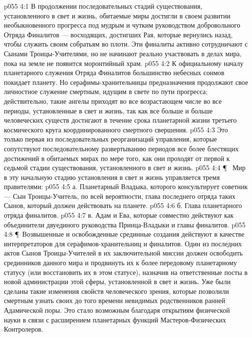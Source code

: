 \vs p055 4:1 В продолжении последовательных стадий существования, установленного в свет и жизнь, обитаемые миры достигли в своем развитии необыкновенного прогресса под мудрым и чутким руководством добровольного Отряда Финалитов --- восходящих, достигших Рая, которые вернулись назад, чтобы служить своим собратьям во плоти. Эти финалиты активно сотрудничают с Сынами Троицы\hyp{}Учителями, но не начинают реально участвовать в делах мира, пока на земле не появится моронтийный храм.
\vs p055 4:2 К официальному началу планетарного служения Отряда Финалитов большинство небесных сонмов покидает планету. Но серафимы\hyp{}хранительницы предназначения продолжают свое личностное служение смертным, идущим в свете по пути прогресса; действительно, такие ангелы приходят во все возрастающем числе во все периоды, установленные в свет и жизнь, так как все больше и больше человеческих существ достигают в течение срока планетарной жизни третьего космического круга координированного смертного свершения.
\vs p055 4:3 Это только первая из последовательных реорганизаций управления, которые сопутствуют последовательному развертыванию периодов все более блестящих достижений в обитаемых мирах по мере того, как они проходят от первой к седьмой стадии существования, установленного в свет и жизнь.
\vs p055 4:4 \P\ \bibnobreakspace {} Мир в эту начальную стадию установления в свет и жизнь управляется тремя правителями:
\vs p055 4:5 а. Планетарный Владыка, которого консультирует советник --- Сын Троицы\hyp{}Учитель, по всей вероятности, глава последнего отряда таких Сынов, который должен действовать на планете.
\vs p055 4:6 б. Глава планетарного отряда финалитов.
\vs p055 4:7 в. Адам и Ева, которые совместно действуют как объединители двуединого руководства Принца\hyp{}Владыки и главы финалитов.
\vs p055 4:8 \P\ Возвышенные и освобожденные срединные создания действуют в качестве интерпретаторов для серафимов\hyp{}хранительниц и финалитов. Один из последних актов Сынов Троицы\hyp{}Учителей в их заключительной миссии должен освободить срединников данного мира и продвинуть их к более передовому планетарному статусу (или восстановить их в этом статусе), назначив на ответственные посты в новой администрации этой сферы, установленной в свет и жизнь. Уже были сделаны такие изменения свойств человеческого зрения, которые позволили смертным узнать своих до того времени невидимых родственников ранней Адамической поры. Это стало возможным благодаря открытиям физической науки в связи с расширением планетарных функций Мастеров\hyp{}Физических Контролеров.
